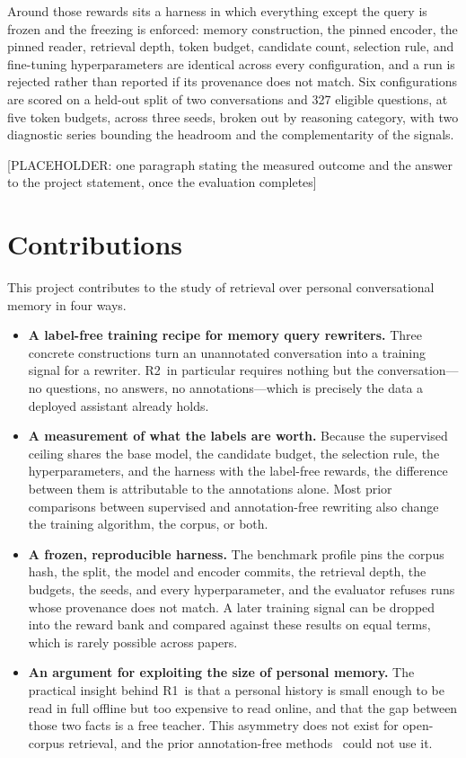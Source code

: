 \documentclass[12pt,letterpaper,oneside]{report}
\newcommand{\ph}[1]{\textcolor{phtext}{[\textsf{\footnotesize PLACEHOLDER: #1}]}}
\newcommand{\Ra}{R1}
\newcommand{\Rb}{R2}
\begin{document}
Around those rewards sits a harness in which everything except the query is
frozen and the freezing is enforced: memory construction, the pinned encoder,
the pinned reader, retrieval depth, token budget, candidate count, selection
rule, and fine-tuning hyperparameters are identical across every configuration,
and a run is rejected rather than reported if its provenance does not match.
Six configurations are scored on a held-out split of two conversations and 327
eligible questions, at five token budgets, across three seeds, broken out by
reasoning category, with two diagnostic series bounding the headroom and the
complementarity of the signals.

\ph{one paragraph stating the measured outcome and the answer to the project
statement, once the evaluation completes}

\section{Contributions}
\label{sec:contributions}

This project contributes to the study of retrieval over personal
conversational memory in four ways.

\begin{itemize}[leftmargin=*,itemsep=4pt,topsep=4pt]
\item \textbf{A label-free training recipe for memory query rewriters.} Three
concrete constructions turn an unannotated conversation into a training signal
for a rewriter. \Rb\ in particular requires nothing but the conversation---no
questions, no answers, no annotations---which is precisely the data a deployed
assistant already holds.

\item \textbf{A measurement of what the labels are worth.} Because the
supervised ceiling shares the base model, the candidate budget, the selection
rule, the hyperparameters, and the harness with the label-free rewards, the
difference between them is attributable to the annotations alone. Most prior
comparisons between supervised and annotation-free rewriting also change the
training algorithm, the corpus, or both.

\item \textbf{A frozen, reproducible harness.} The benchmark profile pins the
corpus hash, the split, the model and encoder commits, the retrieval depth, the
budgets, the seeds, and every hyperparameter, and the evaluator refuses runs
whose provenance does not match. A later training signal can be dropped into
the reward bank and compared against these results on equal terms, which is
rarely possible across papers.

\item \textbf{An argument for exploiting the size of personal memory.} The
practical insight behind \Ra\ is that a personal history is small enough to be
read in full offline but too expensive to read online, and that the gap between
those two facts is a free teacher. This asymmetry does not exist for
open-corpus retrieval, and the prior annotation-free
methods~\cite{convsearchr1,rlqr,adaqr} could not use it.
\end{itemize}
\end{document}

